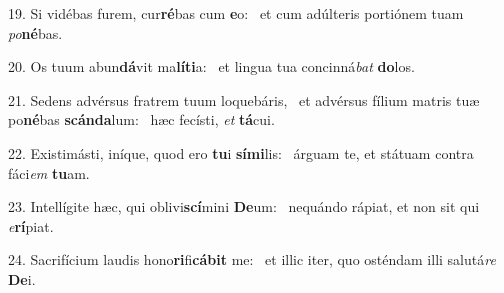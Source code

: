 19. Si vidébas furem, cur\textbf{ré}bas cum \textbf{e}o: \ast\  et cum adúlteris portiónem tuam \textit{po}\textbf{né}bas.\

20. Os tuum abun\textbf{dá}vit ma\textbf{lí}\textbf{ti}a: \ast\  et lingua tua concinná\textit{bat} \textbf{do}los.\

21. Sedens advérsus fratrem tuum loquebáris, \dag\  et advérsus fílium matris tuæ po\textbf{né}bas \textbf{scán}\textbf{da}lum: \ast\  hæc fecísti, \textit{et} \textbf{tá}cui.\

22. Existimásti, iníque, quod ero \textbf{tu}i \textbf{sí}\textbf{mi}lis: \ast\  árguam te, et státuam contra fáci\textit{em} \textbf{tu}am.\

23. Intellígite hæc, qui oblivi\textbf{scí}mini \textbf{De}um: \ast\  nequándo rápiat, et non sit qui \textit{e}\textbf{rí}piat.\

24. Sacrifícium laudis hono\textbf{ri}fi\textbf{cá}\textbf{bit} me: \ast\  et illic iter, quo osténdam illi salutá\textit{re} \textbf{De}i.\

